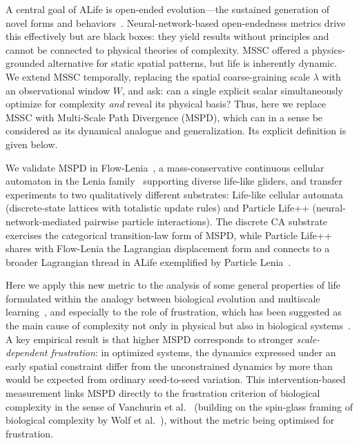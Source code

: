 \documentclass[
  11pt,
]{article}
\begin{document}
A central goal of ALife is open-ended evolution---the sustained
generation of novel forms and behaviors~\cite{stanley2019why,lehman2011abandoning,soros2014identifying,pugh2016quality}. Neural-network-based
open-endedness metrics drive this effectively but are black boxes: they
yield results without principles and cannot be connected to physical
theories of complexity. MSSC offered a physics-grounded alternative
for static spatial patterns, but life is inherently dynamic. We extend
MSSC temporally, replacing the spatial coarse-graining scale \(\lambda\)
with an observational window \(W\), and ask: can a single explicit scalar
simultaneously optimize for complexity \emph{and} reveal its physical basis?
Thus, here we replace MSSC with Multi-Scale Path Divergence (MSPD), which
can in a sense be considered as its dynamical analogue and generalization.
Its explicit definition is given below.

We validate MSPD in Flow-Lenia~\cite{plantec2023flow}, a mass-conservative
continuous cellular automaton in the Lenia family~\cite{chan2019lenia}
supporting diverse life-like gliders, and transfer experiments
to two qualitatively different substrates: Life-like cellular automata
(discrete-state lattices with totalistic update rules) and Particle
Life++ (neural-network-mediated pairwise particle interactions). The
discrete CA substrate exercises the categorical transition-law form of
MSPD, while Particle Life++ shares with Flow-Lenia the Lagrangian
displacement form and connects to a broader Lagrangian thread in ALife
exemplified by Particle Lenia~\cite{mordvintsev2022particle}.

Here we apply this new metric to the analysis of some general properties
of life formulated within the analogy between biological evolution and
multiscale learning~\cite{vanchurin2022thermo}, and especially to the
role of frustration, which has been suggested as the main cause of complexity
not only in physical but also in biological systems~\cite{wolf2018physical}.
A key empirical result is that higher MSPD corresponds to stronger
\emph{scale-dependent frustration}: in optimized systems, the dynamics
expressed under an early spatial constraint differ from the unconstrained
dynamics by more than would be expected from ordinary seed-to-seed
variation. This intervention-based measurement links MSPD directly to
the frustration criterion of biological complexity in the sense of
Vanchurin et al.~\cite{vanchurin2022toward} (building on the spin-glass
framing of biological complexity by Wolf et al.~\cite{wolf2018physical}),
without the metric being optimised for frustration.
\end{document}
